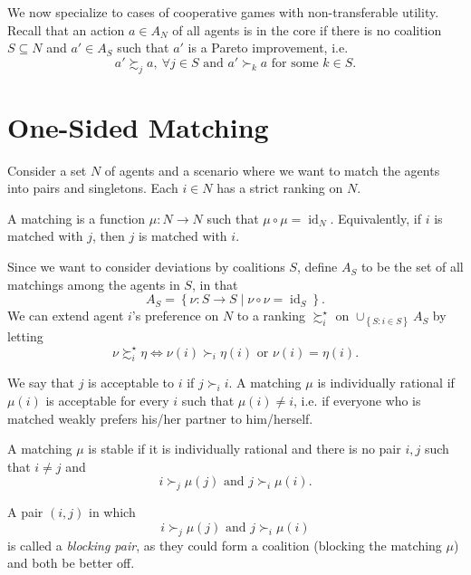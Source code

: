 
We now specialize to cases of cooperative games with non-transferable utility. Recall that an action $a \in A_N$ of all agents is in the core if there is no coalition $S \subseteq N$ and $a' \in A_S$ such that $a'$ is a Pareto improvement, i.e. \[
	a' \succsim_j a, \ \forall j \in S \text{ and } a' \succ_k a \text{ for some } k \in S
.\] 
\section{One-Sided Matching}

Consider a set $N$ of agents and a scenario where we want to match the agents into pairs and singletons.
Each $i \in N$ has a strict ranking on $N$.

\begin{definition}[Matching]
	A matching is a function $\mu: N \to N$ such that $\mu \circ \mu = \operatorname{id}_N$. Equivalently, if $i$ is matched with $j$, then $j$ is matched with $i$.
\end{definition}

Since we want to consider deviations by coalitions $S$, define $A_S$ to be the set of all matchings among the agents in $S$, in that \[
	A_S = \left\{\nu: S\to S \mid \nu \circ \nu = \operatorname{id}_S\right\}
.\] 
We can extend agent $i$'s preference on $N$ to a ranking $\succsim_i^\star$ on $\cup_{\left\{S: i \in S\right\}} A_S$ by letting \[
	\nu \succsim_i^\star \eta \iff \nu(i) \succ_i \eta(i) \text{ or } \nu(i) = \eta(i)
.\] 

\begin{definition}
	We say that $j$ is acceptable to $i$ if $j \succ_i i$. A matching $\mu$ is individually rational if $\mu(i)$ is acceptable for every $i$ such that $\mu(i) \ne i$, i.e. if everyone who is matched weakly prefers his/her partner to him/herself.
\end{definition}

\begin{definition}
	A matching $\mu$ is stable if it is individually rational and there is no pair $i,j$ such that $i \ne j$ and \[
		i \succ_j \mu(j) \text{ and } j \succ_i \mu(i)
	.\] 

	A pair $(i,j)$ in which \[
		i \succ_j \mu(j) \text{ and } j \succ_i \mu(i)
	\] is called a \emph{blocking pair}, as they could form a coalition (blocking the matching $\mu$) and both be better off.
\end{definition}

